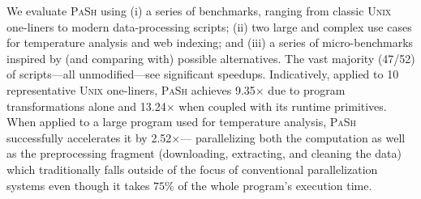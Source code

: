 \documentclass[sigplan, review, screen, anonymous]{acmart}
\newcommand{\ttt}[1]{\texttt{#1}}
\newcommand{\kk}[1]{[{\color{magenta}kk: #1}]}
\newcommand{\sys}{{\scshape PaSh}\xspace}
\newcommand{\unix}{{\scshape Unix}\xspace}
\begin{document}
We evaluate \sys using
  (i) a series of benchmarks, ranging from classic \unix one-liners to modern data-processing scripts;
  (ii) two large and complex use cases for temperature analysis and web indexing;
and 
  (iii) a series of micro-benchmarks inspired by (and comparing with) possible alternatives.
The vast majority (47/52) of scripts---all unmodified---see significant speedups.
Indicatively, applied to 10 representative \unix one-liners,
 \sys achieves 9.35$\times$ due to program transformations alone and 13.24$\times$ when coupled with its runtime primitives.
When applied to a large program used for temperature analysis, 
  \sys successfully accelerates it by 2.52$\times$---
  parallelizing both the computation as well as the preprocessing fragment (downloading, extracting, and cleaning the data) which traditionally falls outside of the focus of conventional parallelization systems even though it takes $75\%$ of the whole program's execution time.


\end{document}
